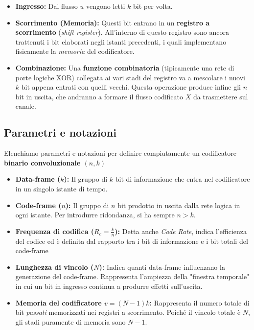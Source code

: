 
\begin{itemize}
    \item \textbf{Ingresso:} Dal flusso $u$ vengono letti $k$ bit per volta.
    \item \textbf{Scorrimento (Memoria):} Questi bit entrano in un \textbf{registro a scorrimento} (\textit{shift register}). All'interno di questo registro sono ancora trattenuti i bit elaborati negli istanti precedenti, i quali implementano fisicamente la \textit{memoria} del codificatore.
    \item \textbf{Combinazione:} Una \textbf{funzione combinatoria} (tipicamente una rete di porte logiche XOR) collegata ai vari stadi del registro va a mescolare i nuovi $k$ bit appena entrati con quelli vecchi. Questa operazione produce infine gli $n$ bit in uscita, che andranno a formare il flusso codificato $X$ da trasmettere sul canale.
\end{itemize}

\subsection{Parametri e notazioni}
Elenchiamo parametri e notazioni per definire compiutamente un codificatore \textbf{binario convoluzionale $(n,k)$}
\begin{itemize}

\item \textbf{Data-frame ($k$):} Il gruppo di $k$ bit di informazione che entra nel codificatore in un singolo istante di tempo.

\item \textbf{Code-frame ($n$):} Il gruppo di $n$ bit prodotto in uscita dalla rete logica in ogni istante. Per introdurre ridondanza, si ha sempre $n > k$.

\item \textbf{Frequenza di codifica ($R_c = \frac{k}{n}$):} Detta anche \textit{Code Rate}, indica l'efficienza del codice ed è definita dal rapporto tra i bit di informazione e i bit totali del code-frame

\item \textbf{Lunghezza di vincolo ($N$):} Indica quanti data-frame influenzano la generazione del code-frame. Rappresenta l'ampiezza della "finestra temporale" in cui un bit in ingresso continua a produrre effetti sull'uscita.
\item \textbf{Memoria del codificatore $v=(N-1)k$:} Rappresenta il numero totale di bit \textit{passati}  memorizzati nei registri a scorrimento. Poiché il vincolo totale è $N$, gli stadi puramente di memoria sono $N-1$.
\end{itemize}

